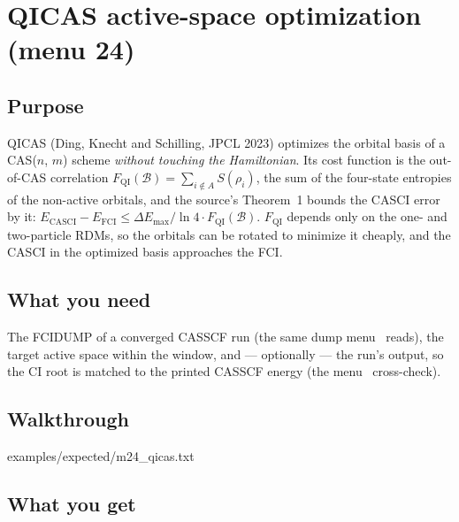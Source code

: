 \chapter{QICAS active-space optimization (menu 24)}
\label{ch:menu24}

\section{Purpose}

QICAS (Ding, Knecht and Schilling, JPCL 2023) optimizes the orbital basis of a
CAS($n$, $m$) scheme \emph{without touching the Hamiltonian}.  Its cost
function is the out-of-CAS correlation
$F_{\mathrm{QI}}(\mathcal{B}) = \sum_{i \notin A} S(\rho_i)$, the sum of the
four-state entropies of the non-active orbitals, and the source's Theorem~1
bounds the CASCI error by it:
$E_{\mathrm{CASCI}} - E_{\mathrm{FCI}} \le \Delta E_{\max}/\ln 4 \cdot
F_{\mathrm{QI}}(\mathcal{B})$.  $F_{\mathrm{QI}}$ depends only on the one- and
two-particle RDMs, so the orbitals can be rotated to minimize it cheaply, and
the CASCI in the optimized basis approaches the FCI.

\section{What you need}

The FCIDUMP of a converged CASSCF run (the same dump menu~ reads),
the target active space  within the window, and --- optionally
--- the run's output, so the CI root is matched to the printed CASSCF energy
(the menu~ cross-check).

\section{Walkthrough}


  {examples/expected/m24_qicas.txt}

\section{What you get}

